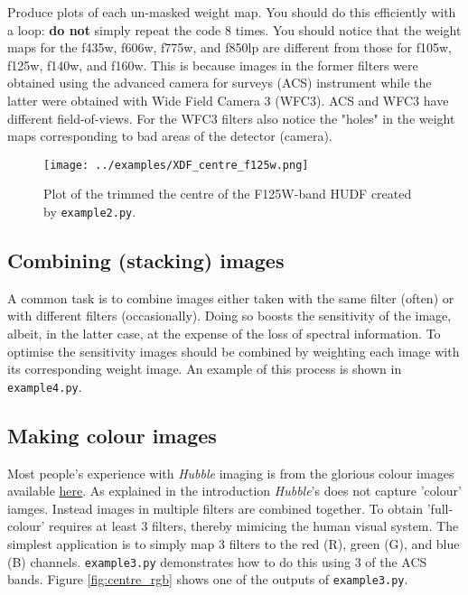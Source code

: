\documentclass{article}
\begin{document}
\begin{question}
Produce plots of each un-masked weight map. You should do this efficiently with a loop: \textbf{do not} simply repeat the code 8 times. You should notice that the weight maps for the f435w, f606w, f775w, and f850lp are different from those for f105w, f125w, f140w, and f160w. This is because images in the former filters were obtained using the advanced camera for surveys (ACS) instrument while the latter were obtained with Wide Field Camera 3 (WFC3). ACS and WFC3 have different field-of-views. For the WFC3 filters also notice the "holes" in the weight maps corresponding to bad areas of the detector (camera).
\end{question}


\begin{figure}\label{fig:centre_f125w}
	\centering
	\texttt{[image: ../examples/XDF\_centre\_f125w.png]}
	\caption{Plot of the trimmed the centre of the F125W-band HUDF created by \texttt{example2.py}.}
\end{figure}


\subsection{Combining (stacking) images}

A common task is to combine images either taken with the same filter (often) or with different filters (occasionally). Doing so boosts the sensitivity of the image, albeit, in the latter case, at the expense of the loss of spectral information. To optimise the sensitivity images should be combined by weighting each image with its corresponding weight image. An example of this process is shown in \texttt{example4.py}.


\subsection{Making colour images}

Most people's experience with {\em Hubble} imaging is from the glorious colour images available \href{https://hubblesite.org}{here}. As explained in the introduction {\em Hubble}'s does not capture 'colour' iamges. Instead images in multiple filters are combined together. To obtain 'full-colour' requires at least 3 filters, thereby mimicing the human visual system. The simplest application is to simply map 3 filters to the red (R), green (G), and blue (B) channels. \texttt{example3.py} demonstrates how to do this using 3 of the ACS bands. Figure \ref{fig:centre_rgb} shows one of the outputs of \texttt{example3.py}.
\end{document}
